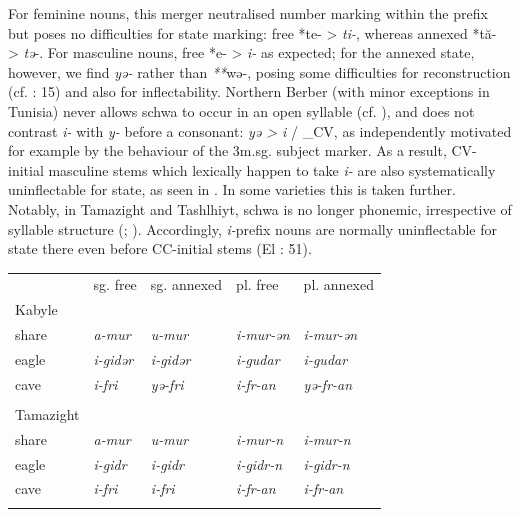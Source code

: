 \documentclass[output=paper]{langscibook}
\begin{document}
\begin{styleStandarduser}
For feminine nouns, this merger neutralised number marking within the prefix but poses no difficulties for state marking: free *te- > \textit{ti-}, whereas annexed *tă- > \textit{tə}{}-. For masculine nouns, free *e- > \textit{i-} as expected; for the annexed state, however, we find \textit{yə-} rather than \textit{**}wə-, posing some difficulties for reconstruction (cf. \citealt{Prasse1974}: 15) and also for inflectability. Northern Berber (with minor exceptions in Tunisia) never allows schwa to occur in an open syllable (cf. \citealt{Kossmann1995}), and does not contrast \textit{i-} with \textit{y-} before a consonant: \textit{yə > i} / \_CV, as independently motivated for example by the behaviour of the 3m.sg. subject marker. As a result, CV-initial masculine stems which lexically happen to take \textit{i-} are also systematically uninflectable for state, as seen in . In some varieties this is taken further. Notably, in Tamazight and Tashlhiyt, schwa is no longer phonemic, irrespective of syllable structure (\citealt{DellElmedlaoui1985}; \citealt{Ridouane2008}). Accordingly, \textit{i-}prefix nouns are normally uninflectable for state there even before CC-initial stems (El \citealt{Moujahid1982}: 51).
\end{styleStandarduser}

\begin{styleLangsciTableHeading}%
\begin{table}
\caption{\textit{i}{}-prefixed stems contrasted with \textit{a}{}-prefixed ones in Kabyle and Tamazight}
\label{tab:key:4}
\end{table}\end{styleLangsciTableHeading}


\begin{tabularx}{\textwidth}{XXXXX}
 & sg. free & sg. annexed & pl. free & pl. annexed\\
\lsptoprule
Kabyle \citep{Dallet1982} &  &  &  & \\
share & \textit{a-mur} & \textit{u-mur} & \textit{i-mur-ən} & \textit{i-mur-ən}\\
eagle & \textit{i-gidər} & \textit{i-gidər} & \textit{i-gudar} & \textit{i-gudar}\\
cave & \textit{i-fri} & \textit{yə-fri} & \textit{i-fr-an} & \textit{yə-fr-an}\\
&  &  &  & \\
Tamazight \citep{Taïfi1991} &  &  &  & \\
share & \textit{a-mur} & \textit{u-mur} & \textit{i-mur-n} & \textit{i-mur-n}\\
eagle & \textit{i-gidr} & \textit{i-gidr} & \textit{i-gidr-n} & \textit{i-gidr-n}\\
cave & \textit{i-fri} & \textit{i-fri} & \textit{i-fr-an} & \textit{i-fr-an}\\
\lspbottomrule
\end{tabularx}
\end{document}
